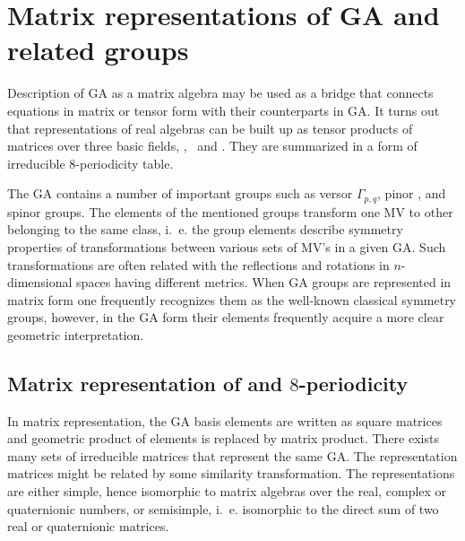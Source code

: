 \chapter{Matrix representations of GA and related groups}

Description of GA as a matrix algebra may be used as a bridge that
connects equations in matrix or tensor form with their
counterparts in GA. It turns out that representations of real
algebras  can be built up as tensor products of matrices
over three basic fields, \bbR, \bbC\ and \bbH.  
They are summarized in a form of irreducible $8$-periodicity table.

The GA contains a number of important groups such as versor
$\Gamma_{p,q}$, pinor , and spinor  groups.
The elements of the mentioned groups transform one MV to other
belonging to the same class, i.~e. the group elements describe
symmetry properties of transformations between various sets of
MV's in a given GA. Such transformations are often related  with
the reflections and rotations in $n$-dimensional spaces having
different metrics. When GA groups are represented in matrix form
one frequently recognizes them as the well-known classical
symmetry groups, however, in the GA form their elements frequently
acquire a more clear geometric interpretation.

\section{Matrix representation of  and $8$-periodicity}
In matrix representation, the GA basis elements are written as
square matrices and geometric product of elements is replaced by matrix
product. There exists many sets of irreducible matrices that
represent the same GA. The representation matrices might be related by some
similarity transformation. The representations are either simple,
hence isomorphic to matrix algebras over the real, complex or
quaternionic numbers, or semisimple, i.~e. isomorphic to the
direct sum of two real or quaternionic matrices.

